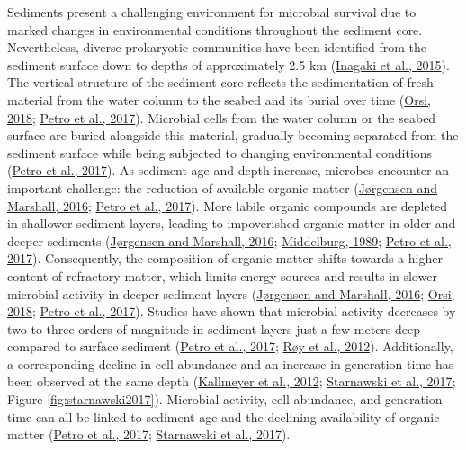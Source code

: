 \documentclass[
  12 pt,
]{book}
\begin{document}
Sediments present a challenging environment for microbial survival due to marked changes in environmental conditions throughout the sediment core. Nevertheless, diverse prokaryotic communities have been identified from the sediment surface down to depths of approximately 2.5 \si{\km} (\protect\hyperlink{ref-Inagaki2015}{Inagaki et al., 2015}). The vertical structure of the sediment core reflects the sedimentation of fresh material from the water column to the seabed and its burial over time (\protect\hyperlink{ref-Orsi2018}{Orsi, 2018}; \protect\hyperlink{ref-Petro2017}{Petro et al., 2017}). Microbial cells from the water column or the seabed surface are buried alongside this material, gradually becoming separated from the sediment surface while being subjected to changing environmental conditions (\protect\hyperlink{ref-Petro2017}{Petro et al., 2017}). As sediment age and depth increase, microbes encounter an important challenge: the reduction of available organic matter (\protect\hyperlink{ref-Jorgensen2016}{Jørgensen and Marshall, 2016}; \protect\hyperlink{ref-Petro2017}{Petro et al., 2017}). More labile organic compounds are depleted in shallower sediment layers, leading to impoverished organic matter in older and deeper sediments (\protect\hyperlink{ref-Jorgensen2016}{Jørgensen and Marshall, 2016}; \protect\hyperlink{ref-Middelburg1989}{Middelburg, 1989}; \protect\hyperlink{ref-Petro2017}{Petro et al., 2017}). Consequently, the composition of organic matter shifts towards a higher content of refractory matter, which limits energy sources and results in slower microbial activity in deeper sediment layers (\protect\hyperlink{ref-Jorgensen2016}{Jørgensen and Marshall, 2016}; \protect\hyperlink{ref-Orsi2018}{Orsi, 2018}; \protect\hyperlink{ref-Petro2017}{Petro et al., 2017}). Studies have shown that microbial activity decreases by two to three orders of magnitude in sediment layers just a few meters deep compared to surface sediment (\protect\hyperlink{ref-Petro2017}{Petro et al., 2017}; \protect\hyperlink{ref-Roy2012}{Røy et al., 2012}). Additionally, a corresponding decline in cell abundance and an increase in generation time has been observed at the same depth (\protect\hyperlink{ref-Kallmeyer2012}{Kallmeyer et al., 2012}; \protect\hyperlink{ref-Starnawski2017}{Starnawski et al., 2017}; Figure \ref{fig:starnawski2017}). Microbial activity, cell abundance, and generation time can all be linked to sediment age and the declining availability of organic matter (\protect\hyperlink{ref-Petro2017}{Petro et al., 2017}; \protect\hyperlink{ref-Starnawski2017}{Starnawski et al., 2017}).
\bigskip
\end{document}
